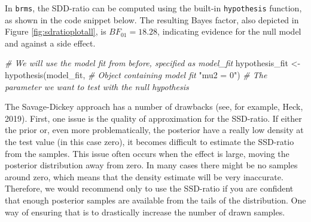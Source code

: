 \documentclass[
  english,
  doc,floatsintext]{apa6}
\newenvironment{Shaded}{\begin{snugshade}}{\end{snugshade}}
\newcommand{\CommentTok}[1]{\textcolor[rgb]{0.56,0.35,0.01}{\textit{#1}}}
\newcommand{\DecValTok}[1]{\textcolor[rgb]{0.00,0.00,0.81}{#1}}
\newcommand{\FloatTok}[1]{\textcolor[rgb]{0.00,0.00,0.81}{#1}}
\newcommand{\FunctionTok}[1]{\textcolor[rgb]{0.00,0.00,0.00}{#1}}
\newcommand{\NormalTok}[1]{#1}
\newcommand{\OtherTok}[1]{\textcolor[rgb]{0.56,0.35,0.01}{#1}}
\newcommand{\SpecialCharTok}[1]{\textcolor[rgb]{0.00,0.00,0.00}{#1}}
\newcommand{\StringTok}[1]{\textcolor[rgb]{0.31,0.60,0.02}{#1}}
\begin{document}
\scriptsize

\begin{Shaded}
\end{Shaded}

\normalsize

In \texttt{brms}, the SDD-ratio can be computed using the built-in \texttt{hypothesis} function, as shown in the code snippet below. The resulting Bayes factor, also depicted in Figure \ref{fig:sdratioplotall}, is \(BF_{01} = 18.28\), indicating evidence for the null model and against a side effect.
~

\scriptsize

\begin{Shaded}
\begin{Highlighting}[]
\CommentTok{\# We will use the model fit from before, specified as model\_fit}
\NormalTok{hypothesis\_fit }\OtherTok{\textless{}{-}} \FunctionTok{hypothesis}\NormalTok{(model\_fit,    }\CommentTok{\# Object containing model fit }
                             \StringTok{"mu2 = 0"}\NormalTok{)   }\CommentTok{\# The parameter we want to test with the null hypothesis }
\end{Highlighting}
\end{Shaded}

\normalsize

The Savage-Dickey approach has a number of drawbacks (see, for example, Heck, 2019). First, one issue is the quality of approximation for the SSD-ratio. If either the prior or, even more problematically, the posterior have a really low density at the test value (in this case zero), it becomes difficult to estimate the SSD-ratio from the samples. This issue often occurs when the effect is large, moving the posterior distribution away from zero. In many cases there might be no samples around zero, which means that the density estimate will be very inaccurate. Therefore, we would recommend only to use the SSD-ratio if you are confident that enough posterior samples are available from the tails of the distribution. One way of ensuring that is to drastically increase the number of drawn samples.
\end{document}
